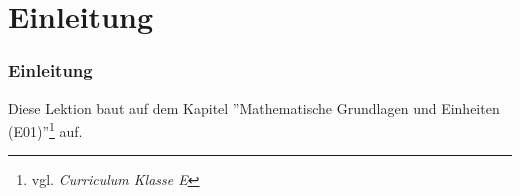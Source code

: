

\subtitle{Technik Klasse A 01: \\
          Mathematische Grundkenntnisse \\[2em]}
\date{Stand 16.04.2015}


\section{Einleitung}

\begin{frame}
    \frametitle{Einleitung}

    Diese Lektion baut auf dem Kapitel ''Mathematische Grundlagen und Einheiten
    (E01)''\footnote{vgl. \emph{Curriculum Klasse E}\hyperlink{refs}{\cite{curr}}} auf.
   

\end{frame}

